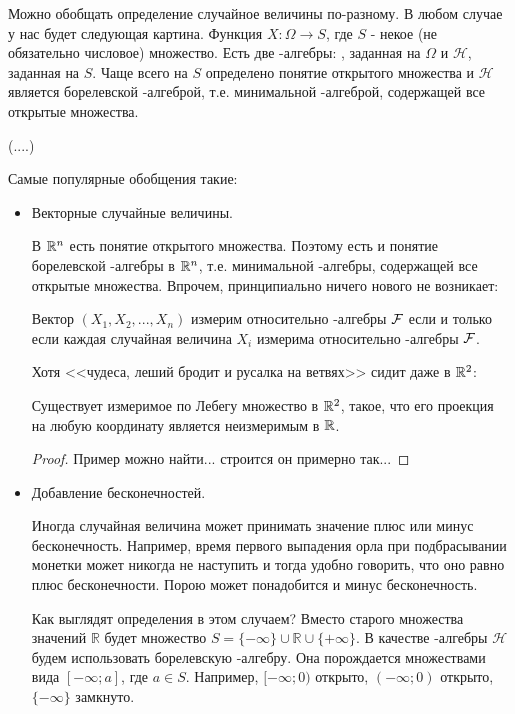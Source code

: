 {Можно обобщать определение случайное величины по-разному. В любом случае у нас будет следующая картина. Функция $X:\Omega\to S$, где $S$ - некое (не обязательно числовое) множество. Есть две \s-алгебры: \F, заданная на $\Omega$ и $\mathcal{H}$, заданная на $S$. Чаще всего на $S$ определено понятие открытого множества и $\mathcal{H}$ является борелевской \s-алгеброй, т.е. минимальной \s-алгеброй, содержащей все открытые множества.


(....)

Самые популярные обобщения такие:

\begin{itemize}

\item Векторные случайные величины.

В $\mathbb R^{n}$ есть понятие открытого множества. Поэтому есть и понятие борелевской \s-алгебры в $\mathbb R^{n}$, т.е. минимальной \s-алгебры, содержащей все открытые множества. Впрочем, принципиально ничего нового не возникает:

\begin{myth}
Вектор $(X_{1},X_{2},..., X_{n})$ измерим относительно \s-алгебры $\mathcal{F}$ если и только если каждая случайная величина $X_{i}$ измерима относительно \s-алгебры $\mathcal{F}$.
\end{myth}

Хотя <<чудеса, леший бродит и русалка на ветвях>> сидит даже в $\mathbb R^{2}$:
\begin{myth}
Существует измеримое по Лебегу множество в $\mathbb R^{2}$, такое, что его проекция на любую координату является неизмеримым в $\mathbb R$.
\end{myth}

\begin{proof}
Пример можно найти... строится он примерно так...
\end{proof}

\item Добавление бесконечностей.

Иногда случайная величина может принимать значение плюс или минус бесконечность. Например, время первого выпадения орла при подбрасывании монетки может никогда не наступить и тогда удобно говорить, что оно равно плюс бесконечности. Порою может понадобится и минус бесконечность.

Как выглядят определения в этом случаем? Вместо старого множества значений $\mathbb{R}$ будет множество $S=\{-\infty\}\cup \mathbb{R}\cup\{+\infty\}$. В качестве \s-алгебры $\mathcal{H}$ будем использовать борелевскую \s-алгебру. Она порождается множествами вида $[-\infty;a]$, где $a\in S$. Например, $[-\infty;0)$ открыто, $(-\infty;0)$ открыто, $\{-\infty\}$ замкнуто.



\end{itemize}}
